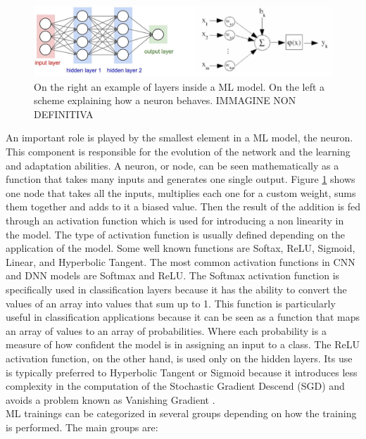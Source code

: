 \documentclass[12pt]{report}
\begin{document}
\begin{figure}[h!]
    \centering
    \includegraphics[width=140mm]{Figures/Chapter1/modelstructure.jpeg} 
    \caption{On the right an example of layers inside a ML model. On the left a scheme explaining how a neuron behaves. IMMAGINE NON DEFINITIVA}
    \label{fig:modelstructure}    
\end{figure}

An important role is played by the smallest element in a ML model, the neuron. This component is responsible for the evolution of the network and the learning and adaptation abilities. A neuron, or node, can be seen mathematically as a function that takes many inputs and generates one single output. Figure \ref{fig:modelstructure} shows one node that takes all the inputs, multiplies each one for a custom weight, sums them together and adds to it a biased value. Then the result of the addition is fed through an activation function which is used for introducing a non linearity in the model. The type of activation function is usually defined depending on the application of the model. Some well known functions are Softax, ReLU, Sigmoid, Linear, and Hyperbolic Tangent. 
The most common activation functions in CNN and DNN models are Softmax and ReLU. 
The Softmax activation function is specifically used in classification layers because it has the ability to convert the values of an array into values that sum up to 1. This function is particularly useful in classification applications because it can be seen as a function that maps an array of values to an array of probabilities. Where each probability is a measure of how confident the model is in assigning an input to a class. The ReLU activation function, on the other hand, is used only on the hidden layers. Its use is typically preferred to Hyperbolic Tangent or Sigmoid because it introduces less complexity in the computation of the Stochastic Gradient Descend (SGD) and avoids a problem known as Vanishing Gradient \cite{ReLU_explanation}.\\
ML trainings can be categorized in several groups depending on how the training is performed. The main groups are:
\end{document}
